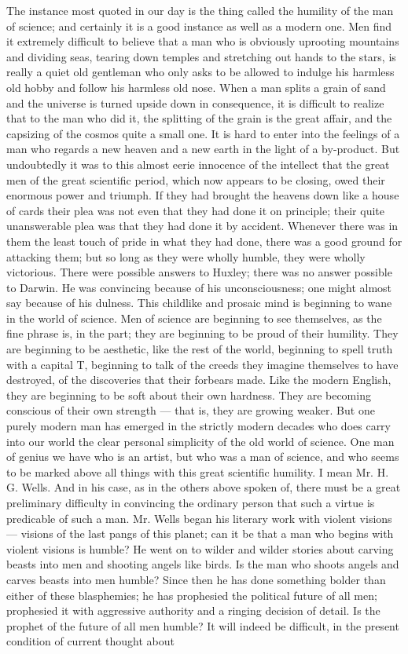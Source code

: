 The instance most quoted in our day is the thing called the humility of the man of science; and certainly it is a good instance as well as a modern one. Men find it extremely difficult to believe that a man who is obviously uprooting mountains and dividing seas, tearing down temples and stretching out hands to the stars, is really a quiet old gentleman who only asks to be allowed to indulge his harmless old hobby and follow his harmless old nose. When a man splits a grain of sand and the universe is turned upside down in consequence, it is difficult to realize that to the man who did it, the splitting of the grain is the great affair, and the capsizing of the cosmos quite a small one. It is hard to enter into the feelings of a man who regards a new heaven and a new earth in the light of a by-product. But undoubtedly it was to this almost eerie innocence of the intellect that the great men of the great scientific period, which now appears to be closing, owed their enormous power and triumph. If they had brought the heavens down like a house of cards their plea was not even that they had done it on principle; their quite unanswerable plea was that they had done it by accident. Whenever there was in them the least touch of pride in what they had done, there was a good ground for attacking them; but so long as they were wholly humble, they were wholly victorious. There were possible answers to Huxley; there was no answer possible to Darwin. He was convincing because of his unconsciousness; one might almost say because of his dulness. This childlike and prosaic mind is beginning to wane in the world of science. Men of science are beginning to see themselves, as the fine phrase is, in the part; they are beginning to be proud of their humility. They are beginning to be aesthetic, like the rest of the world, beginning to spell truth with a capital T, beginning to talk of the creeds they imagine themselves to have destroyed, of the discoveries that their forbears made. Like the modern English, they are beginning to be soft about their own hardness. They are becoming conscious of their own strength — that is, they are growing weaker. But one purely modern man has emerged in the strictly modern decades who does carry into our world the clear personal simplicity of the old world of science. One man of genius we have who is an artist, but who was a man of science, and who seems to be marked above all things with this great scientific humility. I mean Mr. H. G. Wells. And in his case, as in the others above spoken of, there must be a great preliminary difficulty in convincing the ordinary person that such a virtue is predicable of such a man. Mr. Wells began his literary work with violent visions — visions of the last pangs of this planet; can it be that a man who begins with violent visions is humble? He went on to wilder and wilder stories about carving beasts into men and shooting angels like birds. Is the man who shoots angels and carves beasts into men humble? Since then he has done something bolder than either of these blasphemies; he has prophesied the political future of all men; prophesied it with aggressive authority and a ringing decision of detail. Is the prophet of the future of all men humble? It will indeed be difficult, in the present condition of current thought about 